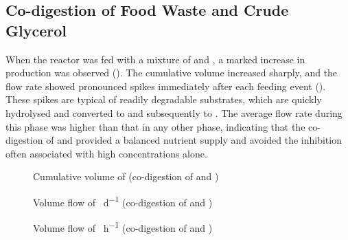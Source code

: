 \subsection{Co-digestion of Food Waste and Crude Glycerol}
\label{subsec:codigestion_phase}

When the reactor was fed with a mixture of  and , a marked increase in  production was observed (). The cumulative  volume increased sharply, and the flow rate showed pronounced spikes immediately after each feeding event (). These spikes are typical of readily degradable substrates, which are quickly hydrolysed and converted to  and subsequently to . The average flow rate during this phase was higher than that in any other phase, indicating that the co-digestion of  and  provided a balanced nutrient supply and avoided the inhibition often associated with high  concentrations alone.

\begin{figure}[H]
    \centering
    \caption{Cumulative volume of  \unit{\nml} (co-digestion of  and )}
    \label{graph:ra-accumulation}
\end{figure}

\begin{figure}[H]
    \centering
    \caption{Volume flow of  \unit{\nml\per\day} (co-digestion of  and )}
    \label{graph:ra-flow}
\end{figure}

\begin{figure}[H]
    \centering
    \caption{Volume flow of  \unit{\nml\per\hour} (co-digestion of  and )}
    \label{graph:ra-flow-30}
\end{figure}

